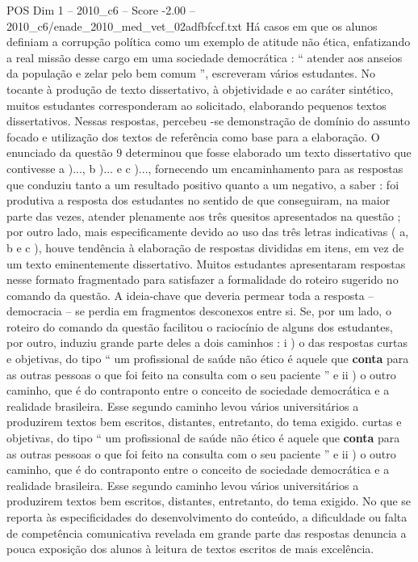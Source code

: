 \begin{textsample}{POS Dim 1 – 2010\_c6 – Score -2.00 – 2010\_c6/enade\_2010\_med\_vet\_02adfbfccf.txt}
Há casos em que os alunos definiam a corrupção política como um exemplo de atitude não ética, enfatizando a real missão desse cargo em uma sociedade democrática : “ atender aos anseios da população e zelar pelo bem comum ”, escreveram vários estudantes.
No tocante à produção de texto dissertativo, à objetividade e ao caráter sintético, muitos estudantes corresponderam ao solicitado, elaborando pequenos textos dissertativos.
Nessas respostas, percebeu -se demonstração de domínio do assunto focado e utilização dos textos de referência como base para a elaboração.
O enunciado da questão 9 determinou que fosse elaborado um texto dissertativo que contivesse a )..., b )... e c )..., fornecendo um encaminhamento para as respostas que conduziu tanto a um resultado positivo quanto a um negativo, a saber : foi produtiva a resposta dos estudantes no sentido de que conseguiram, na maior parte das vezes, atender plenamente aos três quesitos apresentados na questão ; por outro lado, mais especificamente devido ao uso das três letras indicativas ( a, b e c ), houve tendência à elaboração de respostas divididas em itens, em vez de um texto eminentemente dissertativo.
Muitos estudantes apresentaram respostas nesse formato fragmentado para satisfazer a formalidade do roteiro sugerido no comando da questão.
A ideia-chave que deveria permear toda a resposta – democracia – se perdia em fragmentos desconexos entre si.
Se, por um lado, o roteiro do comando da questão facilitou o raciocínio de alguns dos estudantes, por outro, induziu grande parte deles a dois caminhos : i ) o das respostas curtas e objetivas, do tipo “ um profissional de saúde não ético é aquele que \textbf{conta} para as outras pessoas o que foi feito na consulta com o seu paciente ” e ii ) o outro caminho, que é do contraponto entre o conceito de sociedade democrática e a realidade brasileira.
Esse segundo caminho levou vários universitários a produzirem textos bem escritos, distantes, entretanto, do tema exigido. curtas e objetivas, do tipo “ um profissional de saúde não ético é aquele que \textbf{conta} para as outras pessoas o que foi feito na consulta com o seu paciente ” e ii ) o outro caminho, que é do contraponto entre o conceito de sociedade democrática e a realidade brasileira.
Esse segundo caminho levou vários universitários a produzirem textos bem escritos, distantes, entretanto, do tema exigido.
No que se reporta às especificidades do desenvolvimento do conteúdo, a dificuldade ou falta de competência comunicativa revelada em grande parte das respostas denuncia a pouca exposição dos alunos à leitura de textos escritos de mais excelência.

\end{textsample}
